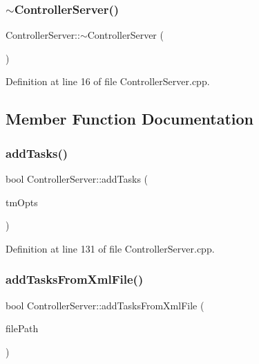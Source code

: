\subsubsection{\texorpdfstring{$\sim$\+Controller\+Server()}{~ControllerServer()}}
{\footnotesize\ttfamily Controller\+Server\+::$\sim$\+Controller\+Server (\begin{DoxyParamCaption}{ }\end{DoxyParamCaption})\hspace{0.3cm}{\ttfamily [virtual]}}



Definition at line 16 of file Controller\+Server.\+cpp.



\subsection{Member Function Documentation}
\hypertarget{classocra__recipes_1_1ControllerServer_ad78efdf5d90308b0dc8e88d6d0720c5f}{}\label{classocra__recipes_1_1ControllerServer_ad78efdf5d90308b0dc8e88d6d0720c5f} 
\subsubsection{\texorpdfstring{add\+Tasks()}{addTasks()}}
{\footnotesize\ttfamily bool Controller\+Server\+::add\+Tasks (\begin{DoxyParamCaption}\item[{std\+::vector$<$ \hyperlink{classocra_1_1TaskBuilderOptions}{ocra\+::\+Task\+Builder\+Options} $>$ \&}]{tm\+Opts }\end{DoxyParamCaption})}



Definition at line 131 of file Controller\+Server.\+cpp.

\hypertarget{classocra__recipes_1_1ControllerServer_ad2ca7fafa8c7fff009581df869f65d85}{}\label{classocra__recipes_1_1ControllerServer_ad2ca7fafa8c7fff009581df869f65d85} 
\subsubsection{\texorpdfstring{add\+Tasks\+From\+Xml\+File()}{addTasksFromXmlFile()}}
{\footnotesize\ttfamily bool Controller\+Server\+::add\+Tasks\+From\+Xml\+File (\begin{DoxyParamCaption}\item[{const std\+::string \&}]{file\+Path }\end{DoxyParamCaption})}




